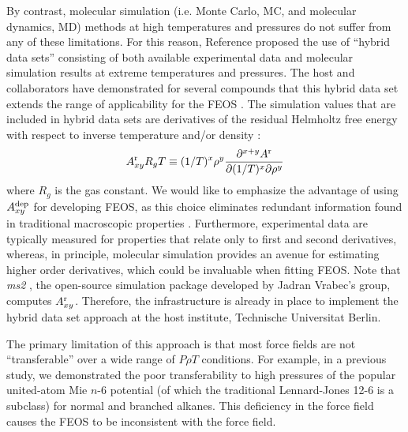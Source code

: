 \documentclass[11pt,a4paper]{article}
\begin{document}
By contrast, molecular simulation (i.e. Monte Carlo, MC, and molecular dynamics, MD) methods at high temperatures and pressures do not suffer from any of these limitations. For this reason, Reference  proposed the use of ``hybrid data sets'' consisting of both available experimental data and molecular simulation results at extreme temperatures and pressures. The host and collaborators have demonstrated for several compounds that this hybrid data set extends the range of applicability for the FEOS \cite{Thol2016_siloxane_first,Thol2016_siloxane,Thol2017,Rutkai2013,Thol2015}. The simulation values that are included in hybrid data sets are derivatives of the residual Helmholtz free energy with respect to inverse temperature and/or density :
\begin{equation} \label{Residual Derivatives}
A_{xy}^{\rm r} R_gT \equiv (1/T)^x\rho^y \frac{\partial^{x+y}A^{\rm r}}{\partial(1/T)^x \partial \rho^y}
\end{equation}
where $R_g$ is the gas constant. We would like to emphasize the advantage of using $A_{xy}^{\rm dep}$ for developing FEOS, as this choice eliminates redundant information found in traditional macroscopic properties \cite{Thol2016_LJ,Thol_LJTS,Rutkai2017,Lustig2015,Rutkai2013,Rutkai2015}. Furthermore, experimental data are typically measured for properties that relate only to first and second derivatives, whereas, in principle, molecular simulation provides an avenue for estimating higher order derivatives, which could be invaluable when fitting FEOS. Note that \textit{ms2} \cite{ms2}, the open-source simulation package developed by Jadran Vrabec's group, computes $A_{xy}^{\rm r}$. Therefore, the infrastructure is already in place to implement the hybrid data set approach at the host institute, Technische Universitat Berlin.
 

The primary limitation of this approach is that most force fields are not ``transferable'' over a wide range of $P \rho T$ conditions. For example, in a previous study, we demonstrated the poor transferability to high pressures of the popular united-atom Mie $n$-6 potential (of which the traditional Lennard-Jones 12-6 is a subclass) for normal and branched alkanes. This deficiency in the force field causes the FEOS to be inconsistent with the force field. 
\end{document}
